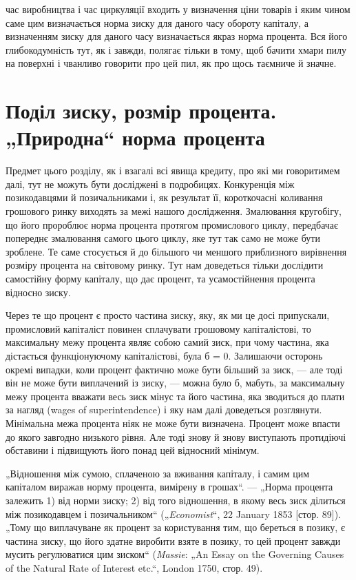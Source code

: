 \parcont{}  %
час виробництва і час циркуляції входить у визначення ціни
товарів і яким чином саме цим визначається норма зиску для
даного часу обороту капіталу, а визначенням зиску для даного
часу визначається якраз норма процента. Вся його глибокодумність
тут, як і завжди, полягає тільки в тому, щоб бачити хмари
пилу на поверхні і чванливо говорити про цей пил, як про щось
таємниче й значне.

\section{Поділ зиску, розмір процента. „Природна“ норма
процента}

Предмет цього розділу, як і взагалі всі явища кредиту, про
які ми говоритимем далі, тут не можуть бути досліджені в подробицях.
Конкуренція між позикодавцями й позичальниками і,
як результат її, короткочасні коливання грошового ринку виходять
за межі нашого дослідження. Змалювання кругобігу, що
його пророблює норма процента протягом промислового циклу,
передбачає попереднє змалювання самого цього циклу, яке тут
так само не може бути зроблене. Те саме стосується й до більшого
чи меншого приблизного вирівнення розміру процента
на світовому ринку. Тут нам доведеться тільки дослідити самостійну
форму капіталу, що дає процент, та усамостійнення процента
відносно зиску.

Через те що процент є просто частина зиску, яку, як ми
це досі припускали, промисловий капіталіст повинен сплачувати
грошовому капіталістові, то максимальну межу процента
являє собою самий зиск, при чому частина, яка дістається функціонуючому
капіталістові, була б = 0. Залишаючи осторонь окремі
випадки, коли процент фактично може бути більший за зиск, —
але тоді він не може бути виплачений із зиску, — можна було б,
мабуть, за максимальну межу процента вважати весь зиск мінус
та його частина, яка зводиться до плати за нагляд (wages
of superintendence) і яку нам далі доведеться розглянути. Мінімальна
межа процента ніяк не може бути визначена. Процент
може впасти до якого завгодно низького рівня. Але тоді знову
й знову виступають протидіючі обставини і підвищують його
понад цей відносний мінімум.

„Відношення між сумою, сплаченою за вживання капіталу,
і самим цим капіталом виражав норму процента, вимірену в
грошах“. — „Норма процента залежить 1) від норми зиску; 2) від
того відношення, в якому весь зиск ділиться між позикодавцем
і позичальником“ („\emph{Economist}“, 22 January 1853 [стор. 89]). „Тому
що виплачуване як процент за користування тим, що береться в
позику, є частина зиску, що його здатне виробити взяте в позику,
то цей процент завжди мусить регулюватися цим зиском“
(\emph{Massie}: „An Essay on the Governing Causes of the Natural Rate of
Interest etc.“, London 1750, стор. 49).
